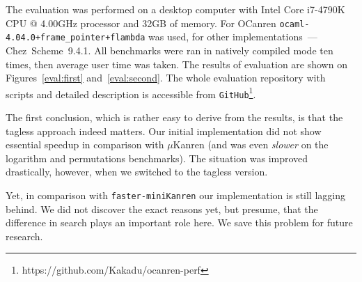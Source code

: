 The evaluation was performed on a desktop computer with Intel Core i7-4790K CPU @ 4.00GHz processor and 32GB of memory.
For OCanren \mbox{\texttt{ocaml-4.04.0+frame_pointer+flambda}} was used, for other implementations~--- Chez~Scheme~9.4.1.
All benchmarks were ran in natively compiled mode ten times, then average user time was taken. The results of evaluation
are shown on Figures~\ref{eval:first} and~\ref{eval:second}. The whole evaluation repository with scripts and detailed
description is accessible from \lstinline{GitHub}\footnote{https://github.com/Kakadu/ocanren-perf}.

The first conclusion, which is rather easy to derive from the results, is that the tagless approach indeed matters. Our initial
implementation did not show essential speedup in comparison with $\mu$Kanren (and was even \emph{slower} on the logarithm
and permutations benchmarks). The situation was improved drastically, however, when we switched to the tagless version.

Yet, in comparison with \texttt{faster-miniKanren} our implementation is still lagging behind. We did not discover the exact
reasons yet, but presume, that the difference in search plays an important role here.
We save this problem for future research.
